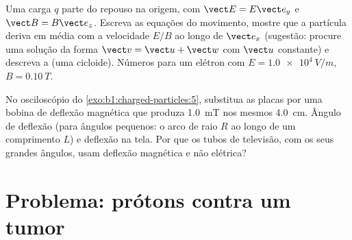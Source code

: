 \begin{exercise}[$\star\star\star$]\label{exo:b1:charged-particles:11}
Uma carga $q$ parte do repouso na origem, com $\vect E = E\vect e_y$ e
$\vect B = B\vect e_z$. Escreva as equações do movimento, mostre que a
partícula deriva em média com a velocidade $E/B$ ao longo de $\vect e_x$
(sugestão: procure uma solução da forma $\vect v = \vect u + \vect w$ com
$\vect u$ constante) e descreva a  (uma cicloide). Números para
um elétron com $E = \qty{1.0e4}{V/m}$, $B = \qty{0.10}{T}$.
\end{exercise}

\begin{exercise}[$\star\star\star$]\label{exo:b1:charged-particles:12}
No osciloscópio do \cref{exo:b1:charged-particles:5}, substitua as
placas por uma bobina de deflexão magnética que produza \qty{1.0}{mT} nos
mesmos \qty{4.0}{cm}. Ângulo de deflexão (para ângulos pequenos: o arco de raio $R$
ao longo de um comprimento $L$) e deflexão na tela. Por que os tubos de
televisão, com os seus grandes ângulos, usam deflexão magnética e não
elétrica?
\end{exercise}

\section{Problema: prótons contra um tumor}

